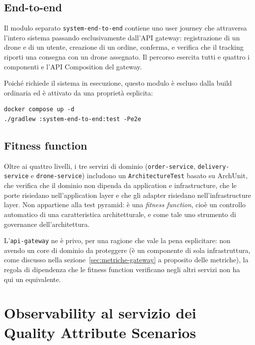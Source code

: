 \documentclass[12pt,a4paper]{article}
\begin{document}
\subsection{End-to-end}

Il modulo separato \texttt{system-end-to-end} contiene uno user journey che attraversa l'intero
sistema passando esclusivamente dall'API gateway: registrazione di un drone e di un utente, creazione
di un ordine, conferma, e verifica che il tracking riporti una consegna con un drone assegnato. Il
percorso esercita tutti e quattro i componenti e l'API Composition del gateway.

Poich\'e richiede il sistema in esecuzione, questo modulo \`e escluso dalla build ordinaria ed \`e
attivato da una propriet\`a esplicita:

\begin{lstlisting}[caption={Esecuzione dei test end-to-end}]
docker compose up -d
./gradlew :system-end-to-end:test -Pe2e
\end{lstlisting}

\subsection{Fitness function}

Oltre ai quattro livelli, i tre servizi di dominio (\texttt{order-service},
\texttt{delivery-service} e \texttt{drone-service}) includono un \texttt{ArchitectureTest} basato su
ArchUnit, che verifica che il dominio non dipenda da application e infrastructure, che le porte
risiedano nell'application layer e che gli adapter risiedano nell'infrastructure layer. Non appartiene
alla test pyramid: \`e una \emph{fitness function}, cio\`e un controllo automatico di una
caratteristica architetturale, e come tale uno strumento di governance dell'architettura.

L'\texttt{api-gateway} ne \`e privo, per una ragione che vale la pena esplicitare: non avendo un core
di dominio da proteggere (\`e un componente di sola infrastruttura, come discusso nella
sezione~\ref{sec:metriche-gateway} a proposito delle metriche), la regola di dipendenza che le
fitness function verificano negli altri servizi non ha qui un equivalente.

\section{Observability al servizio dei Quality Attribute Scenarios}
\label{sec:osservabilita-qas}
\end{document}
